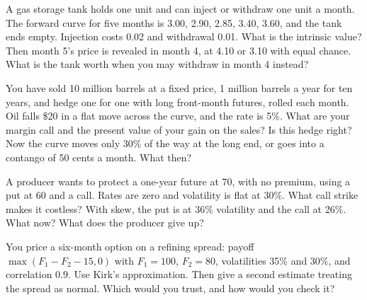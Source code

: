 \begin{question}\label{iq:iv2:commodities-and-energy:16}
A gas storage tank holds one unit and can inject or withdraw one unit a month. The forward curve for five months is 3.00, 2.90, 2.85, 3.40, 3.60, and the tank ends empty. Injection costs 0.02 and withdrawal 0.01. What is the intrinsic value? Then month 5's price is revealed in month 4, at 4.10 or 3.10 with equal chance. What is the tank worth when you may withdraw in month 4 instead?
\end{question}

\begin{question}\label{iq:iv2:commodities-and-energy:17}
You have sold 10 million barrels at a fixed price, 1 million barrels a year for ten years, and hedge one for one with long front-month futures, rolled each month. Oil falls \$20 in a flat move across the curve, and the rate is 5\%. What are your margin call and the present value of your gain on the sales? Is this hedge right? Now the curve moves only 30\% of the way at the long end, or goes into a contango of 50 cents a month. What then?
\end{question}

\begin{question}\label{iq:iv2:commodities-and-energy:18}
A producer wants to protect a one-year future at 70, with no premium, using a put at 60 and a call. Rates are zero and volatility is flat at 30\%. What call strike makes it costless? With skew, the put is at 36\% volatility and the call at 26\%. What now? What does the producer give up?
\end{question}

\begin{question}\label{iq:iv2:commodities-and-energy:19}
You price a six-month option on a refining spread: payoff $\max(F_1 - F_2 - 15, 0)$ with $F_1 = 100$, $F_2 = 80$, volatilities 35\% and 30\%, and correlation 0.9. Use Kirk's approximation. Then give a second estimate treating the spread as normal. Which would you trust, and how would you check it?
\end{question}

